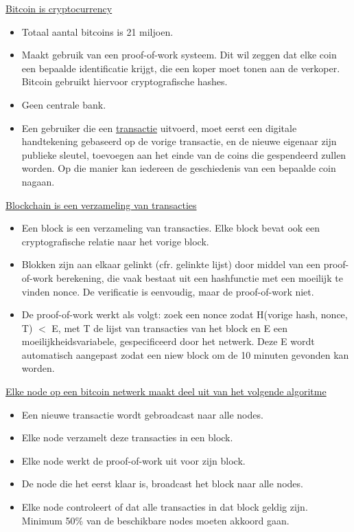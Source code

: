 \documentclass{report}
\begin{document}
	\underline{Bitcoin is cryptocurrency}
	\begin{itemize}
		\item[\info] Totaal aantal bitcoins is 21 miljoen.
		\item[\info] Maakt gebruik van een proof-of-work systeem. Dit wil zeggen dat elke coin een bepaalde identificatie krijgt, die een koper moet tonen aan de verkoper. Bitcoin gebruikt hiervoor cryptografische hashes.
		\item[\info] Geen centrale bank.
		\item[\info] Een gebruiker die een \underline{transactie} uitvoerd, moet eerst een digitale handtekening gebaseerd op de vorige transactie, en de nieuwe eigenaar zijn publieke sleutel, toevoegen aan het einde van de coins die gespendeerd zullen worden. Op die manier kan iedereen de geschiedenis van een bepaalde coin nagaan.
	\end{itemize}

	\underline{Blockchain is een verzameling van transacties}
	\begin{itemize}
		\item[\info] Een block is een verzameling van transacties. Elke block bevat ook een cryptografische relatie naar het vorige block.
		\item[\info] Blokken zijn aan elkaar gelinkt (cfr. gelinkte lijst) door middel van een proof-of-work berekening, die vaak bestaat uit een hashfunctie met een moeilijk te vinden nonce. De verificatie is eenvoudig, maar de proof-of-work niet.
		\item[\info] De proof-of-work werkt als volgt: zoek een nonce zodat H(vorige hash, nonce, T) $<$ E, met T de lijst van transacties van het block en E een moeilijkheidsvariabele, gespecificeerd door het netwerk. Deze E wordt automatisch aangepast zodat een niew block om de 10 minuten gevonden kan worden.
	\end{itemize}

	\underline{Elke node op een bitcoin netwerk maakt deel uit van het volgende algoritme}
	\begin{itemize}
		\item[\info] Een nieuwe transactie wordt gebroadcast naar alle nodes.
		\item[\info] Elke node verzamelt deze transacties in een block.
		\item[\info] Elke node werkt de proof-of-work uit voor zijn block.
		\item[\info] De node die het eerst klaar is, broadcast het block naar alle nodes.
		\item[\info] Elke node controleert of dat alle transacties in dat block geldig zijn. Minimum 50\% van de beschikbare nodes moeten akkoord gaan.
	\end{itemize}
\end{document}
